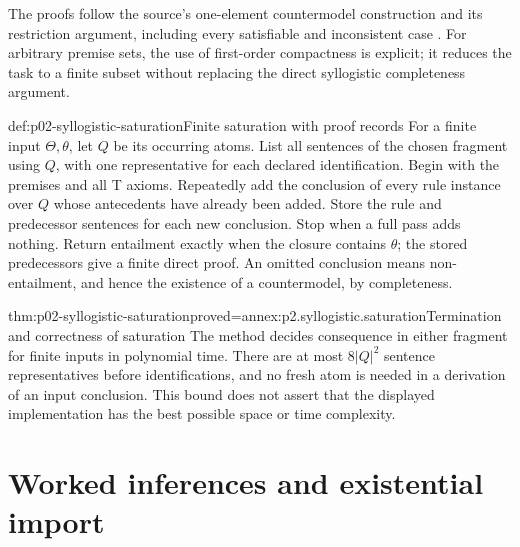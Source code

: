 The proofs follow the source's one-element countermodel construction and its
restriction argument, including every satisfiable and inconsistent case
\cite[Section~3, Lemmas~3.1--3.5 and Theorems~3.6--3.7]
{PrattHartmannMoss2008SyllogisticV1}. For arbitrary premise sets, the use of
first-order compactness is explicit; it reduces the task to a finite subset
without replacing the direct syllogistic completeness argument.

\begin{hbmethod}{def:p02-syllogistic-saturation}{Finite saturation with proof records}
For a finite input \(\Theta,\theta\), let \(Q\) be its occurring atoms.
List all sentences of the chosen fragment using \(Q\), with one representative
for each declared identification. Begin with the premises and all T axioms.
Repeatedly add the conclusion of every rule instance over \(Q\) whose
antecedents have already been added. Store the rule and predecessor sentences
for each new conclusion. Stop when a full pass adds nothing.
Return entailment exactly when the closure contains \(\theta\); the stored
predecessors give a finite direct proof. An omitted conclusion means
non-entailment, and hence the existence of a countermodel, by completeness.
\end{hbmethod}

\begin{hbtheorem}{thm:p02-syllogistic-saturation}{proved=annex:p2.syllogistic.saturation}{Termination and correctness of saturation}
The method decides consequence in either fragment for finite inputs in
polynomial time. There are at most \(8|Q|^2\) sentence representatives before
identifications, and no fresh atom is needed in a derivation of an input
conclusion. This bound does not assert that the displayed implementation has
the best possible space or time complexity.
\end{hbtheorem}

\section{Worked inferences and existential import}

